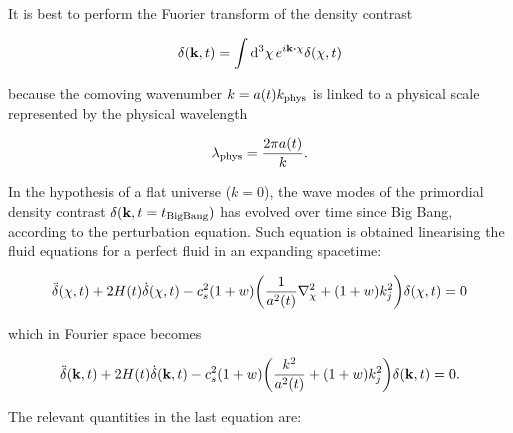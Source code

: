 It is best to perform the Fuorier transform of the density contrast

\begin{equation}
        \delta \qty(\vb{k},t) = \int \dd[3]{\vb{\chi}} e^{i\vb{k} \vdot
        \vb{\chi}} \delta\qty(\vb{\chi},t)
\end{equation}

because the comoving wavenumber $k = a\qty(t) k_\text{phys}$ is linked to a
physical scale represented by the physical wavelength

\begin{equation}
        \lambda_\text{phys} = \frac{2\pi a\qty(t)}{k}.
\end{equation}

In the hypothesis  of a flat universe ($k = 0$), the wave modes of the
primordial density contrast $\delta\qty(\vb{k},t = t_\text{BigBang})$
has evolved over time since Big Bang, according to the perturbation
equation. Such equation is obtained linearising the fluid equations
for a perfect fluid in an expanding spacetime:

\begin{equation}
        \ddot \delta\qty(\vb{\chi},t) + 2H\qty(t)\dot \delta\qty(\vb{\chi},t) -
        c_s^2\qty(1 + w)\qty(\frac{1}{a^2\qty(t)} \laplacian_\chi + \qty(
        1 + w)k^2_j)
        \delta\qty(\vb{\chi},t) = 0
\end{equation}

which in Fourier space becomes

\begin{equation}
        \ddot \delta\qty(\vb{k},t) + 2H\qty(t)\dot \delta\qty(\vb{k},t) -
        c_s^2\qty(1 + w)\qty(\frac{k^2}{a^2\qty(t)} + \qty(1 + w)k^2_j)
        \delta\qty(\vb{k},t) = 0.
        \label{eq:perturbations_density}
\end{equation}

The relevant quantities in the last equation are:


